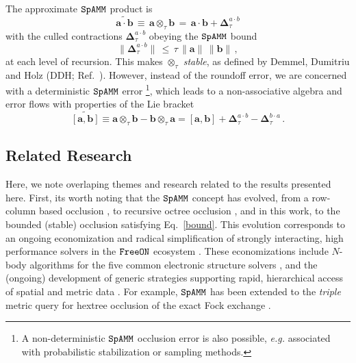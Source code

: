 \documentclass[letterpaper,twocolumn,amsmath,amsfont,amssymb,english,aps,jcp,preprintnumbers,groupaddress,nofootinbib,tightenlines]{revtex4}
\newcommand{\mat}[1]{\boldsymbol{#1}}
\newcommand{\ot}{ {\scriptstyle \otimes}_{ \tau } }
\begin{document}
The approximate $\tt SpAMM$ product is
\begin{equation}
\widetilde{\mat{a}\cdot \mat{b}} \,  \equiv \, \mat{a} \ot \mat{b} \,
  = \, \mat{a} \cdot \mat{b} + \mat{\Delta}^{a \cdot b}_{\tau}
\end{equation}
with the culled contractions $\mat{\Delta}^{a \cdot b}_{\tau}$ obeying
the $\tt SpAMM$ bound
\begin{equation}\label{bound}
\lVert \mat{\Delta}^{a \cdot b}_{\tau} \rVert \, \leq \, \tau \, \lVert \mat{a} \rVert  \,  \lVert \mat{b} \rVert \, ,
\end{equation}
at each level of recursion.  This makes $\ot$ {\em stable}, as defined
by Demmel, Dumitriu and Holz (DDH; Ref.~\cite{Demmel07}).  However,
instead of the roundoff error, we are concerned with a deterministic
$\tt SpAMM$ error%
\footnote{A non-deterministic ${\tt SpAMM}$ occlusion error is also
  possible, {\em e.g.} associated with probabilistic stabilization
  \cite{} or sampling \cite{} methods.},
which leads to a non-associative algebra and error flows with
properties of the Lie bracket
\begin{equation} \label{braket}
\widetilde{\left[ \mat{a} , \mat{b} \right]} \equiv \mat{a} \ot \mat{b}-\mat{b} \ot \mat{a}
=  \left[ \mat{a} , \mat{b} \right]
+ \mat{\Delta}^{a\cdot b}_{\tau} -\mat{\Delta}^{b\cdot a}_{\tau} \,.
\end{equation}

\subsection{Related Research}

Here, we note overlaping themes and research related to the results
presented here.  First, its worth noting that the $\tt SpAMM$ concept
has evolved, from a row-column based occlusion \cite{}, to recursive
octree occlusion \cite{}, and in this work, to the bounded (stable)
occlusion satisfying Eq.~\ref{bound}.  This evolution corresponds to
an ongoing economization and radical simplification of strongly
interacting, high performance solvers in the $\tt FreeON$ ecosystem
\cite{}.  These economizations include $N$-body algorithms for the
five common electronic structure solvers \cite{}, and the (ongoing)
development of generic strategies supporting rapid, hierarchical
access of spatial and metric data \cite{sammet, wise}.  For example,
$\tt SpAMM$ has been extended to the {\em triple} metric query for
hextree occlusion of the exact Fock exchange \cite{}.
\end{document}

